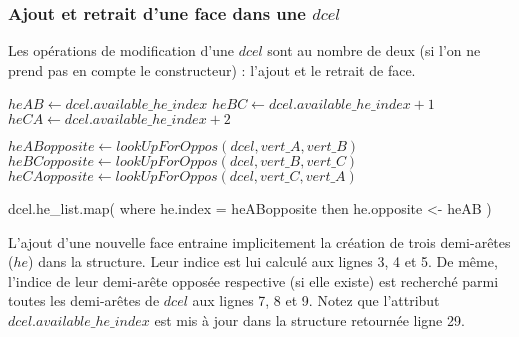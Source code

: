 \documentclass[]{article}
\begin{document}
\begin{multicols}{2}
	\subsubsection{Ajout et retrait d'une face dans une $dcel$}
	Les opérations de modification d'une $dcel$ sont au nombre de deux (si l'on ne prend pas en compte le constructeur) : l'ajout et le retrait de face.\\
	\begin{algorithmic}[1]
		\State $heAB \gets dcel.available\_he\_index$
		\State $heBC \gets dcel.available\_he\_index + 1$
		\State $heCA \gets dcel.available\_he\_index + 2$
		
		\State $heABopposite \gets lookUpForOppos(dcel, vert\_A, vert\_B)$
		\State $heBCopposite \gets lookUpForOppos(dcel, vert\_B, vert\_C)$
		\State $heCAopposite \gets lookUpForOppos(dcel, vert\_C, vert\_A)$
		
		\State \Return dcel.he\_list.map( where he.index = heABopposite then he.opposite <- heAB )
	\end{algorithmic}
	L'ajout d'une nouvelle face entraine implicitement la création de trois demi-arêtes ($he$) dans la structure. Leur indice est lui calculé aux lignes 3, 4 et 5. De même, l'indice de leur demi-arête opposée respective (si elle existe) est recherché parmi toutes les demi-arêtes de $dcel$ aux lignes 7, 8 et 9.
	Notez que l'attribut $dcel.available\_he\_index$ est mis à jour dans la structure retournée ligne 29.
%		
%		


\end{multicols}
\end{document}
